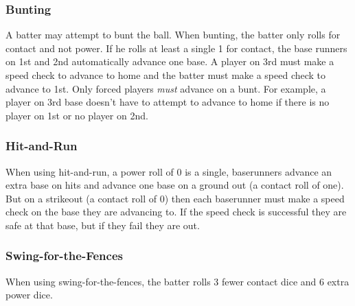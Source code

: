 \documentclass[12pt]{article} %
\begin{document}
\subsubsection{Bunting}
A batter may attempt to bunt the ball.  When bunting, the batter only rolls for contact and not power.  If he rolls at least a single 1 for contact, the base runners on 1st and 2nd automatically advance one base.  A player on 3rd must make a speed check to advance to home and the batter must make a speed check to advance to 1st.  Only forced players \emph{must} advance on a bunt.  For example, a player on 3rd base doesn't have to attempt to advance to home if there is no player on 1st or no player on 2nd.

\subsubsection{Hit-and-Run}
When using hit-and-run, a power roll of 0 is a single, baserunners advance an extra base on hits and advance one base on a ground out (a contact roll of one).  But on a strikeout (a contact roll of 0) then each baserunner must make a speed check on the base they are advancing to.  If the speed check is successful they are safe at that base, but if they fail they are out.

\subsubsection{Swing-for-the-Fences}
When using swing-for-the-fences, the batter rolls 3 fewer contact dice and 6 extra power dice.
\end{document}
